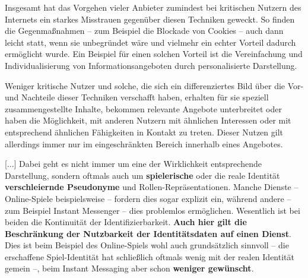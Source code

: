 \vspace{0.3cm}


\begin{Zitat}

Insgesamt hat das Vorgehen vieler Anbieter zumindest bei kritischen Nutzern des Internets ein starkes Misstrauen gegenüber diesen Techniken geweckt. So finden die Gegenmaßnahmen – zum Beispiel die Blockade von Cookies – auch dann leicht statt, wenn sie unbegründet wäre und vielmehr ein echter Vorteil dadurch
ermöglicht wurde. Ein Beispiel für einen solchen Vorteil ist die Vereinfachung und Individualisierung von Informationsangeboten durch personalisierte Darstellung.

Weniger kritische Nutzer und solche, die sich ein differenziertes Bild über die Vor- und Nachteile dieser Techniken verschafft haben, erhalten für sie speziell zusammengestellte Inhalte, bekommen relevante Angebote unterbreitet oder haben die Möglichkeit, mit
anderen Nutzern mit ähnlichen Interessen oder mit entsprechend ähnlichen Fähigkeiten
in Kontakt zu treten. Dieser Nutzen gilt allerdings immer nur im eingeschränkten Bereich
innerhalb eines Angebotes.

\end{Zitat}

\vspace{0.3cm}


\begin{Zitat}[Synonymisierung]

[...] Dabei geht es nicht immer um eine der Wirklichkeit entsprechende Darstellung, sondern oftmals auch um \textbf{spielerische} oder die reale Identität \textbf{verschleiernde Pseudonyme} und Rollen-Repräsentationen. Manche Dienste – Online-Spiele beispielsweise – fordern dies sogar explizit ein, während andere – zum Beispiel Instant Messenger – dies problemlos ermöglichen. Wesentlich ist bei beiden die Kontinuität der Identifizierbarkeit. \textbf{Auch hier gilt die Beschränkung der Nutzbarkeit der Identitätsdaten auf einen Dienst}. Dies ist beim Beispiel des Online-Spiels wohl auch grundsätzlich sinnvoll – die erschaffene Spiel-Identität hat schließlich oftmals wenig mit der realen Identität gemein –, beim Instant Messaging aber schon \textbf{weniger gewünscht}.

\end{Zitat}

\vspace{0.3cm}


